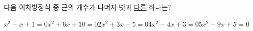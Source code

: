 다음 이차방정식 중 근의 개수가 나머지 넷과 \underline{다른} 하나는?
\begin{choices32}{$x^2-x+1=0$}{$x^2+6x+10=0$}{$2x^2+3x-5=0$}{$4x^2-4x+3=0$}{$5x^2+9x+5=0$}\end{choices32}
